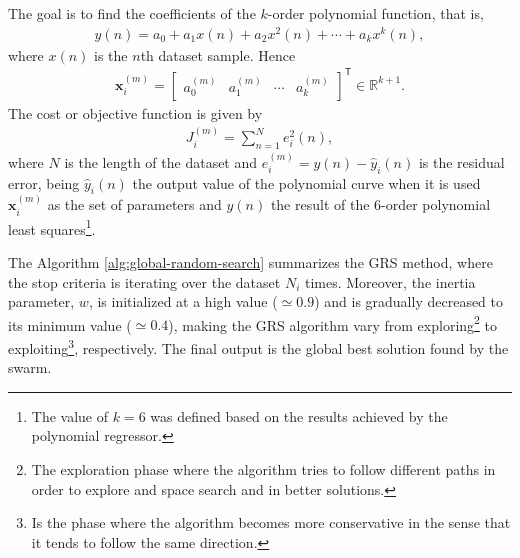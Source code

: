 \documentclass[12pt,a4paper]{article}
\newcommand{\trans}{\mathsf{T}}
\newcommand{\Real}{\mathbb{R}}
\begin{document}
The goal is to find the coefficients of the \(k\)-order polynomial function, that is,
\begin{align}
    y(n) = a_0 + a_1 x(n) + a_2 x^2(n) + \cdots + a_k x^k(n),
\end{align}
where \(x(n)\) is the \(n\)th dataset sample. Hence
 \begin{align}
    \mathbf{x}_i^{(m)} = \begin{bmatrix}
        a_0^{(m)} & a_1^{(m)} & \cdots & a_k^{(m)}
    \end{bmatrix}^\trans \in \Real^{k+1}.
\end{align}
The cost or objective function is given by
\begin{align}
    J_i^{(m)} = \sum_{n=1}^{N} e_i^2 (n),
\end{align}
where \(N\) is the length of the dataset and \(e_i^{(m)} = y(n) - \hat{y}_i(n) \) is the residual error, being \(\hat{y}_i(n)\) the output value of the polynomial curve when it is used \(\mathbf{x}_i^{(m)}\) as the set of parameters and \(y(n)\) the result of the \(6\)-order polynomial least squares\footnote{The value of \(k=6\) was defined based on the results achieved by the polynomial regressor.}.

The Algorithm \ref{alg:global-random-search} summarizes the GRS method, where the stop criteria is iterating over the dataset \(N_i\) times. Moreover, the inertia parameter, \(w\), is initialized at a high value (\(\simeq 0.9\)) and is gradually decreased to its minimum value (\(\simeq 0.4\)), making the GRS algorithm vary from exploring\footnote{The exploration phase where the algorithm tries to follow different paths in order to explore and space search and in better solutions.} to exploiting\footnote{Is the phase where the algorithm becomes more conservative in the sense that it tends to follow the same direction.}, respectively. The final output is the global best solution found by the swarm.
\end{document}
